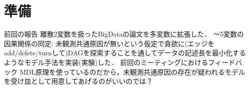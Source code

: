 \documentclass[dvipdfmx]{jsarticle}
\newcommand{\red}[1]{\textcolor{red}{#1}}
\begin{document}
\section{準備}


\begin{outline}
\1 前回の報告
   \2 離散2変数を扱ったBigDataの論文を多変数に拡張した．
      〜5変数の因果関係の同定: 未観測共通原因が無いという仮定で貪欲に(エッジをadd/delete/turnして)DAGを探索することを通してデータの記述長を最小化するようなモデル手法を実装(実験)した．
\1 前回のミーティングにおけるフィードバック
   \2 MDL原理を使っているのだから，未観測共通原因の存在が疑われるモデルを受け皿として用意してあげるのがいいのでは？
        

\end{outline}
\end{document}
